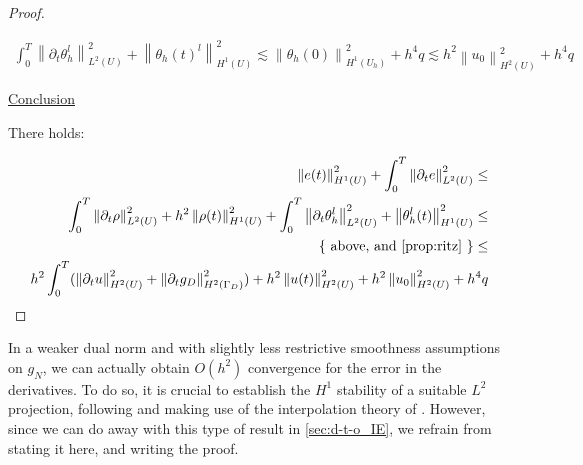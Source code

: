 \documentclass[english,a4paper,10pt,oneside]{scrbook}	%
\theoremstyle{break}
\newenvironment{mproof}[1][\proofname]{%
  \begin{proof}[#1]$ $\par\nobreak\ignorespaces
}{%
  \end{proof}
}
\renewcommand*{\proofname}{Proof}
\theoremstyle{remark}
\newcommand{\norm}[1]{\left\lVert#1\right\rVert}
\newcommand{\ind}[1]{\{\text{ #1 }\}}
\begin{document}
\begin{appendices}
\begin{mproof}
\begin{align*}
\int_0^T\norm{\partial_t \theta_h^l}^2_{L^2(U)} + \norm{\theta_h(t)^l}_{H^1(U)}^2 \lesssim  \norm{\theta_h(0)}_{H^1(U_h)}^2+ h^4q \lesssim h^2\norm{u_0}_{H^2(U)}^2+ h^4q
\end{align*}

\underline{Conclusion}

There holds:

\begin{align*}
\norm{e(t)}_{H^1(U)}^2 + \int_0^T\norm{\partial_t e}^2_{L^2(U)}  \leq \\
\int_0^T\norm{\partial_t \rho}^2_{L^2(U)} + h^2\norm{\rho(t)}_{H^1(U)}^2 + \int_0^T\norm{\partial_t  \theta_h^l}^2_{L^2(U)} + \norm{ \theta_h^l(t)}_{H^1(U)}^2\leq \\\ind{above, and \cref{prop:ritz}}\leq \\
h^2\int_0^T(\norm{\partial_t u }_{H^2(U)}^2 + \norm{\partial_t g_D }_{H^2(\Gamma_D)}^2) + h^2\norm{u(t)}_{H^2(U)}^2 +  h^2\norm{u_0}_{H^2(U)}^2+ h^4q
\end{align*}
\end{mproof}

In a weaker dual norm and with slightly less restrictive smoothness assumptions on $g_N$, we can actually obtain $O(h^2)$ convergence for the error in the derivatives. To do so, it is crucial to establish the $H^1$ stability of a suitable $L^2$ projection, following \cite{bank} and making use of the interpolation theory of \cite{bernardi}. However, since we can do away with this type of result in \cref{sec:d-t-o_IE}, we refrain from stating it here, and writing the proof.



\end{appendices}
\end{document}
